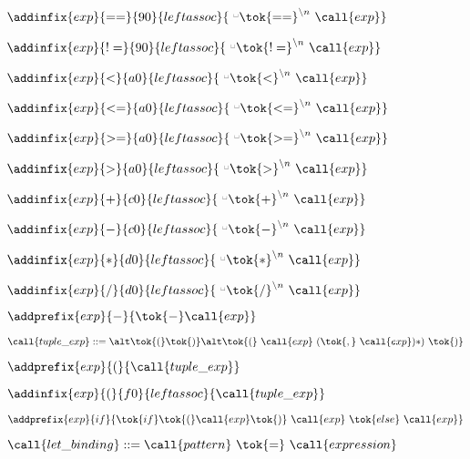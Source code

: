   \item $\addinfix{exp}{==}{90}{leftassoc}{
  \ {{}^{\textrm{\textvisiblespace}}}\tok{==}^{\backslash{}n}\  \call{exp}}$
  \item $\addinfix{exp}{!=}{90}{leftassoc}{
  \ {{}^{\textrm{\textvisiblespace}}}\tok{!=}^{\backslash{}n}\  \call{exp}}$
  \item $\addinfix{exp}{<}{a0}{leftassoc}{
  \ {{}^{\textrm{\textvisiblespace}}}\tok{<}^{\backslash{}n}\  \call{exp}}$
  \item $\addinfix{exp}{<=}{a0}{leftassoc}{
  \ {{}^{\textrm{\textvisiblespace}}}\tok{<=}^{\backslash{}n}\  \call{exp}}$
  \item $\addinfix{exp}{>=}{a0}{leftassoc}{
  \ {{}^{\textrm{\textvisiblespace}}}\tok{>=}^{\backslash{}n}\  \call{exp}}$
  \item $\addinfix{exp}{>}{a0}{leftassoc}{
  \ {{}^{\textrm{\textvisiblespace}}}\tok{>}^{\backslash{}n}\  \call{exp}}$
  \item $\addinfix{exp}{+}{c0}{leftassoc}{
  \ {{}^{\textrm{\textvisiblespace}}}\tok{+}^{\backslash{}n}\  \call{exp}}$
  \item $\addinfix{exp}{-}{c0}{leftassoc}{
  \ {{}^{\textrm{\textvisiblespace}}}\tok{-}^{\backslash{}n}\  \call{exp}}$
  \item $\addinfix{exp}{*}{d0}{leftassoc}{
  \ {{}^{\textrm{\textvisiblespace}}}\tok{*}^{\backslash{}n}\  \call{exp}}$
  \item $\addinfix{exp}{/}{d0}{leftassoc}{
  \ {{}^{\textrm{\textvisiblespace}}}\tok{/}^{\backslash{}n}\  \call{exp}}$
   
 
   \item $\addprefix{exp}{-}{\tok{-} \call{exp}}$
    
 
   \item $\call{tuple\_exp} ::=\\
   \alt \tok{(}\tok{)}\\
   \alt \tok{(}\ \call{exp}\ (\tok{,}\ \call{exp})* )\ \tok{)}$
   \item $\addprefix{exp}{(}{\call{tuple\_exp}}$
   \item $\addinfix{exp}{(}{f0}{leftassoc}{\call{tuple\_exp}}$
    
 
   \item $\addprefix{exp}{if}{\tok{if} \tok{(} \call{exp} \tok{)}
   \ \call{exp}\ \tok{else}\ \call{exp}}$
    
 
   \item $\call{let\_binding} ::= \call{pattern}\ \tok{=}\ \call{expression}$
     
